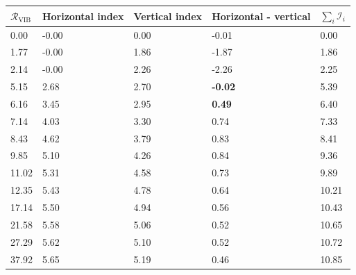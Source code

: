 \begin{tabular}{lllll}
\toprule
$\mathcal R_{\mathrm{VIB}}$ & Horizontal index & Vertical index & Horizontal - vertical & $\sum_i\mathcal I_i$ \\
\midrule
0.00 & -0.00 & 0.00 & -0.01 & 0.00 \\
1.77 & -0.00 & 1.86 & -1.87 & 1.86 \\
2.14 & -0.00 & 2.26 & -2.26 & 2.25 \\
5.15 & 2.68 & 2.70 & \textbf{-0.02} & 5.39 \\
6.16 & 3.45 & 2.95 & \textbf{0.49} & 6.40 \\
7.14 & 4.03 & 3.30 & 0.74 & 7.33 \\
8.43 & 4.62 & 3.79 & 0.83 & 8.41 \\
9.85 & 5.10 & 4.26 & 0.84 & 9.36 \\
11.02 & 5.31 & 4.58 & 0.73 & 9.89 \\
12.35 & 5.43 & 4.78 & 0.64 & 10.21 \\
17.14 & 5.50 & 4.94 & 0.56 & 10.43 \\
21.58 & 5.58 & 5.06 & 0.52 & 10.65 \\
27.29 & 5.62 & 5.10 & 0.52 & 10.72 \\
37.92 & 5.65 & 5.19 & 0.46 & 10.85 \\
\bottomrule
\end{tabular}
